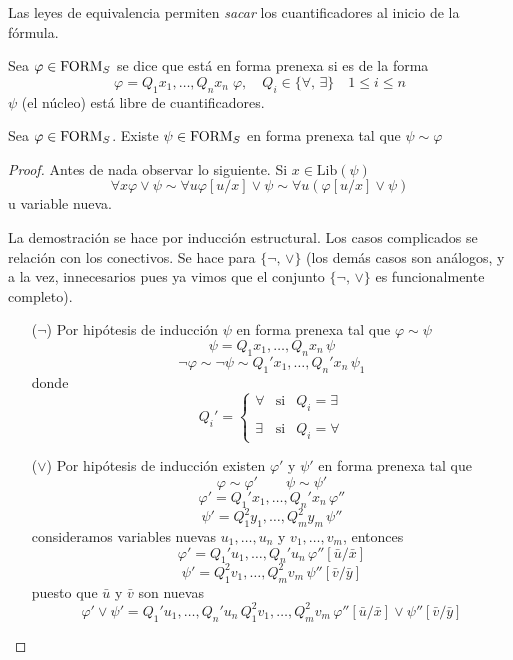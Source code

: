 Las leyes de equivalencia permiten \textit{sacar} los cuantificadores al inicio de la fórmula. 

\begin{definition}
Sea $\varphi \in \mbox{FORM}_{S}$ se dice que está en forma prenexa si es de la forma 
\[ \varphi= Q_1x_1, \ldots, Q_nx_n \; \varphi, \quad Q_i \in \{\forall, \, \exists \} \quad 1 \leq i \leq n \]
$\psi$ (el núcleo) está libre de cuantificadores. 
\end{definition}

\begin{prop}
Sea $\varphi \in \mbox{FORM}_{S}$. Existe $\psi \in \mbox{FORM}_{S}$ en forma prenexa tal que $\psi \sim \varphi$ 
\end{prop}
\begin{proof}
Antes de nada observar lo siguiente. Si $x \in \mbox{Lib}(\psi)$
\[ \forall x \varphi \lor \psi \sim \forall u \varphi[u/x] \lor \psi \sim \forall u (\varphi[u/x] \lor \psi) \]
u variable nueva.

La demostración se hace por inducción estructural. Los casos complicados se relación con los conectivos. Se hace para $\{\neg, \, \lor\}$ (los demás casos son análogos, y a la vez, innecesarios pues ya vimos que el conjunto $\{\neg, \, \lor\}$ es funcionalmente completo). 
\begin{itemize}
	\item[($\neg$)] Por hipótesis de inducción $\psi$ en forma prenexa tal que $\varphi \sim \psi$
	\[ \psi= Q_1x_1, \ldots, Q_nx_n \, \psi  \]
	\[ \neg \varphi \sim \neg \psi \sim Q_1'x_1, \ldots, Q_n'x_n \, \psi_1  \]
	donde 
	\[ Q_i'= \left\lbrace \begin{matrix}
\forall & \mbox{si} & Q_i=\exists\\
	\\
	\exists & \mbox{si} & Q_i=\forall
\end{matrix} \right.	 \]
	\item[($\lor$)] Por hipótesis de inducción existen $\varphi'$ y $\psi'$ en forma prenexa tal que 
	\[ \varphi \sim \varphi' \qquad \psi \sim \psi' \]
	\[ \varphi'= Q_1'x_1, \ldots, Q_n'x_n \, \varphi'' \]
	\[ \psi'= Q_1^2y_1, \ldots, Q_m^2y_m \, \psi'' \]
	consideramos variables nuevas $u_1, \ldots, u_n$ y $v_1, \ldots, v_m$, entonces
	\[ \varphi'= Q_1'u_1, \ldots, Q_n'u_n \, \varphi''[\bar{u}/\bar{x}] \]
	\[ \psi'= Q_1^2v_1, \ldots, Q_m^2v_m \, \psi''[\bar{v}/\bar{y}] \]
	puesto que $\bar{u}$ y $\bar{v}$ son nuevas 
	\[ \varphi' \lor \psi'= Q_1'u_1, \ldots, Q_n'u_n \, Q_1^2v_1, \ldots, Q_m^2v_m \, \varphi''[\bar{u}/\bar{x}] \lor \psi''[\bar{v}/\bar{y}]   \]
\end{itemize} 
\end{proof}